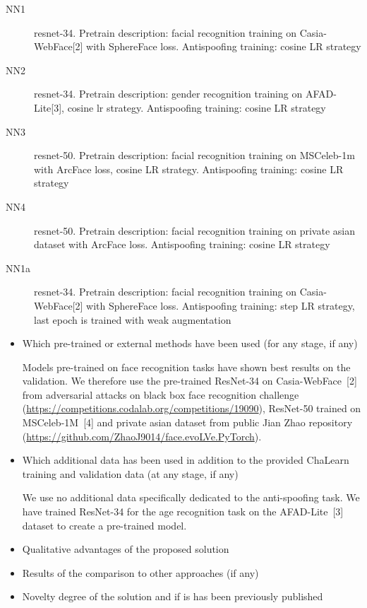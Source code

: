 \documentclass{article}
\begin{document}
\begin{description}
\item[NN1] resnet-34. Pretrain description: facial recognition training on Casia-WebFace[2] with SphereFace loss. Antispoofing training: cosine LR strategy
\item[NN2] resnet-34. Pretrain description: gender recognition training on AFAD-Lite[3], cosine lr strategy. Antispoofing training: cosine LR strategy
\item[NN3] resnet-50. Pretrain description: facial recognition training on MSCeleb-1m with ArcFace loss, cosine LR strategy. Antispoofing training: cosine LR strategy
\item[NN4] resnet-50. Pretrain description: facial recognition training on private asian dataset with ArcFace loss. Antispoofing training: cosine LR strategy
\item[NN1a] resnet-34. Pretrain description: facial recognition training on Casia-WebFace[2] with SphereFace loss. Antispoofing training: step LR strategy, last epoch is trained with weak augmentation
\end{description}

\begin{itemize}
\item Which pre-trained or external methods have been used (for any stage, if any)

Models pre-trained on face recognition tasks have shown best results on the validation. We therefore use the pre-trained ResNet-34 on Casia-WebFace~[2] from adversarial attacks on black box face recognition challenge (\url{https://competitions.codalab.org/competitions/19090}), ResNet-50 trained on MSCeleb-1M~[4] and private asian dataset from public Jian Zhao repository (\url{https://github.com/ZhaoJ9014/face.evoLVe.PyTorch}).

\item Which additional data has been used in addition to the provided ChaLearn training and validation data (at any stage, if any)

We use no additional data specifically dedicated to the anti-spoofing task.
We have trained ResNet-34 for the age recognition task on the AFAD-Lite~[3] dataset to create a pre-trained model.

\item Qualitative advantages of the proposed solution
\item Results of the comparison to other approaches (if any)


\item Novelty degree of the solution and if is has been previously published
\end{itemize}
\end{document}
